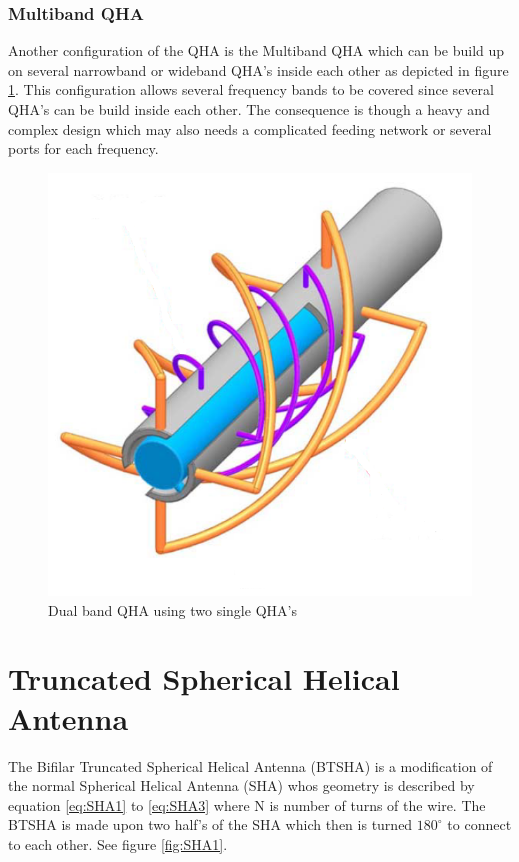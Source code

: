 \subsubsection{Multiband QHA}
Another configuration of the QHA is the Multiband QHA \citep{Bai2014} which can be build up on several narrowband or wideband QHA's inside each other as depicted in figure \ref{fig:TB_QHA}. This configuration allows several frequency bands to be covered since several QHA's can be build inside each other. The consequence is though a heavy and complex design which may also needs a complicated feeding network or several ports for each frequency.  

\begin{figure}[H]
\centering 
\includegraphics[scale = 0.5]{figures/antennas/qha/dual_band}
\caption{Dual band QHA using two single QHA's \citep{Bai2014}}
\label{fig:TB_QHA}
\end{figure} 





\section{Truncated Spherical Helical Antenna}
The Bifilar Truncated Spherical Helical Antenna (BTSHA) is a modification of the normal Spherical Helical Antenna (SHA) whos geometry is described by equation \ref{eq:SHA1} to \ref{eq:SHA3} where N is number of turns of the wire. The BTSHA is made upon two half's of the SHA which then is turned $180^\circ$ to connect to each other. See figure \ref{fig:SHA1}.  

